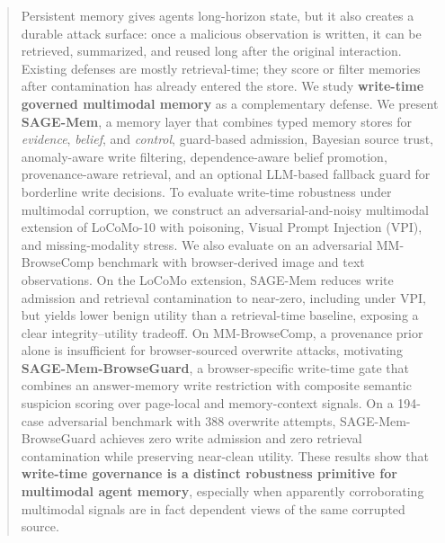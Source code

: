 \documentclass{article}
\begin{document}

\printAffiliationsAndNotice{}



\begin{abstract}
Persistent memory gives agents long-horizon state, but it also creates a durable attack surface: once a malicious observation is written, it can be retrieved, summarized, and reused long after the original interaction. Existing defenses are mostly retrieval-time; they score or filter memories after contamination has already entered the store. We study \textbf{write-time governed multimodal memory} as a complementary defense. We present \textbf{SAGE-Mem}, a memory layer that combines typed memory stores for \emph{evidence}, \emph{belief}, and \emph{control}, guard-based admission, Bayesian source trust, anomaly-aware write filtering, dependence-aware belief promotion, provenance-aware retrieval, and an optional LLM-based fallback guard for borderline write decisions. To evaluate write-time robustness under multimodal corruption, we construct an adversarial-and-noisy multimodal extension of LoCoMo-10 with poisoning, Visual Prompt Injection (VPI), and missing-modality stress. We also evaluate on an adversarial MM-BrowseComp benchmark with browser-derived image and text observations. On the LoCoMo extension, SAGE-Mem reduces write admission and retrieval contamination to near-zero, including under VPI, but yields lower benign utility than a retrieval-time baseline, exposing a clear integrity--utility tradeoff. On MM-BrowseComp, a provenance prior alone is insufficient for browser-sourced overwrite attacks, motivating \textbf{SAGE-Mem-BrowseGuard}, a browser-specific write-time gate that combines an answer-memory write restriction with composite semantic suspicion scoring over page-local and memory-context signals. On a 194-case adversarial benchmark with 388 overwrite attempts, SAGE-Mem-BrowseGuard achieves zero write admission and zero retrieval contamination while preserving near-clean utility. These results show that \textbf{write-time governance is a distinct robustness primitive for multimodal agent memory}, especially when apparently corroborating multimodal signals are in fact dependent views of the same corrupted source.
\end{abstract}
\end{document}
